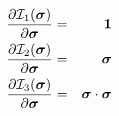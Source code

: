 \begin{eqnarray}
\frac{\partial {\cal I}_1(\bm\sigma)}{\partial \bm\sigma} &=& {\bm 1} \\
\frac{\partial {\cal I}_2(\bm\sigma)}{\partial \bm\sigma} &=& {\bm \sigma} \\
\frac{\partial {\cal I}_3(\bm\sigma)}{\partial \bm\sigma} &=& \bm\sigma \cdot \bm\sigma
\end{eqnarray}



























